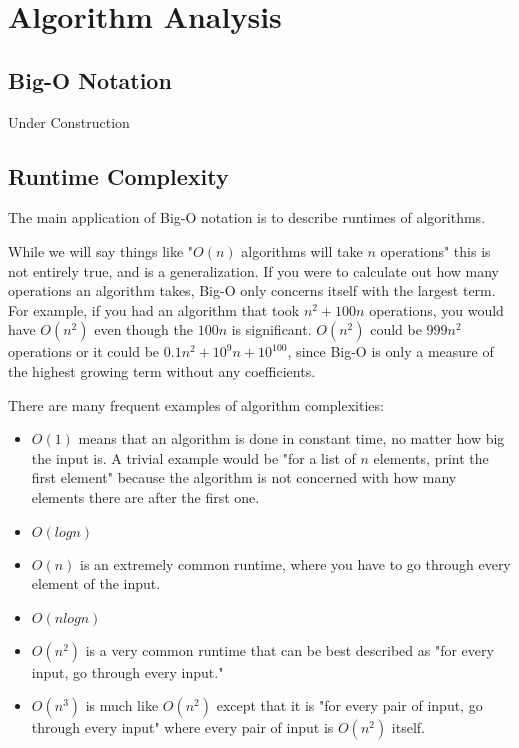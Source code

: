 \section{Algorithm Analysis}

\subsection{Big-O Notation}

Under Construction

\subsection{Runtime Complexity}

The main application of Big-O notation is to describe runtimes of algorithms.

While we will say things like "$O(n)$ algorithms will take $n$ operations" this is not entirely true, and is a generalization. If you were to calculate out how many operations an algorithm takes, Big-O only concerns itself with the largest term. For example, if you had an algorithm that took $n^2 + 100n$ operations, you would have $O(n^2)$ even though the $100n$ is significant. $O(n^2)$ could be $999n^2$ operations or it could be $0.1n^2 + 10^9n + 10^{100}$, since Big-O is only a measure of the highest growing term without any coefficients.

There are many frequent examples of algorithm complexities:

\begin{itemize}
\item $O(1)$ means that an algorithm is done in constant time, no matter how big the input is. A trivial example would be "for a list of $n$ elements, print the first element" because the algorithm is not concerned with how many elements there are after the first one.
\item $O(log n)$
\item $O(n)$ is an extremely common runtime, where you have to go through every element of the input.
\item $O(n log n)$
\item $O(n^2)$ is a very common runtime that can be best described as "for every input, go through every input."
\item $O(n^3)$ is much like $O(n^2)$ except that it is "for every pair of input, go through every input" where every pair of input is $O(n^2)$ itself.
\end{itemize}

